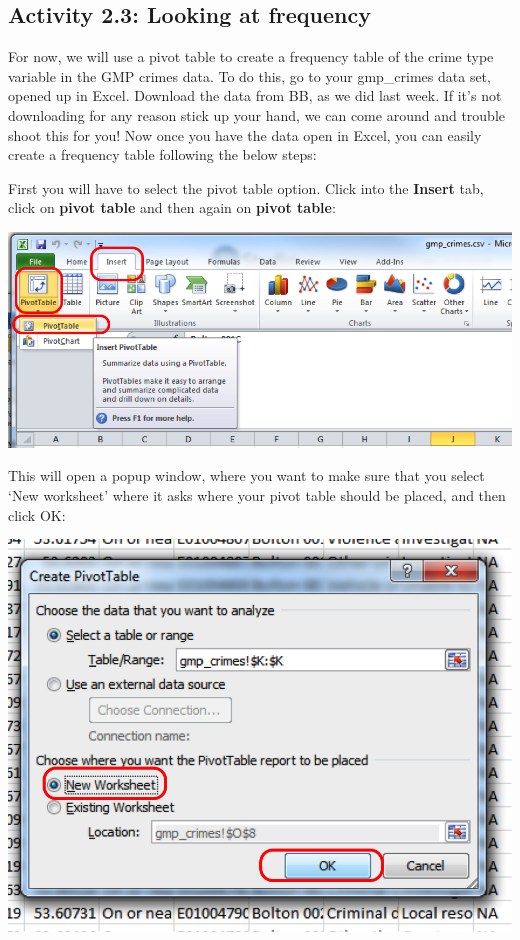 \documentclass[
]{book}
\begin{document}
\hypertarget{activity-2.3-looking-at-frequency}{%
\subsection{Activity 2.3: Looking at frequency}\label{activity-2.3-looking-at-frequency}}

For now, we will use a pivot table to create a frequency table of the crime type variable in the GMP crimes data. To do this, go to your gmp\_crimes data set, opened up in Excel. Download the data from BB, as we did last week. If it's not downloading for any reason stick up your hand, we can come around and trouble shoot this for you! Now once you have the data open in Excel, you can easily create a frequency table following the below steps:

First you will have to select the pivot table option. Click into the \textbf{Insert} tab, click on \textbf{pivot table} and then again on \textbf{pivot table}:

\includegraphics{imgs/click_pivot.png}

This will open a popup window, where you want to make sure that you select `New worksheet' where it asks where your pivot table should be placed, and then click OK:

\includegraphics{imgs/pivot_popup.png}
\end{document}
